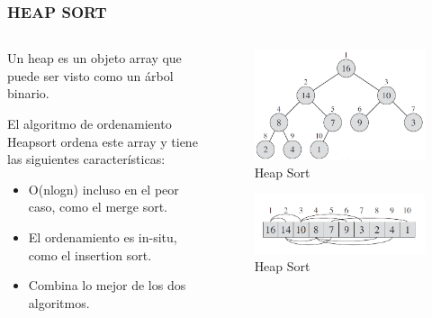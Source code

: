 \documentclass[
	11pt, %
]{beamer}
\begin{document}
\begin{frame}
	\frametitle{HEAP SORT}
    \begin{columns}[t] %
		\begin{column}{0.45\textwidth} %
            Un heap es un objeto array que puede ser visto como un árbol binario.

            El algoritmo de ordenamiento Heapsort ordena este array y tiene las siguientes características:
            \begin{itemize}
              \item O(nlogn) incluso en el peor caso, como el merge sort.
              \item El ordenamiento es in-situ, como el insertion sort.
              \item Combina lo mejor de los dos algoritmos.
            \end{itemize}
		\end{column}		
		\begin{column}{0.5\textwidth} %
			\begin{figure}
		      \includegraphics[width=0.5\linewidth]{heapSort_a.png}
		      \caption{Heap Sort}
	   \end{figure}
					\begin{figure}
		      \includegraphics[width=0.5\linewidth]{heapSort_b.png}
		      \caption{Heap Sort}
	   \end{figure}
		\end{column}
	\end{columns}
\end{frame}
\end{document}
